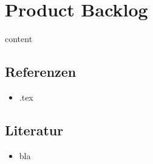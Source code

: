\documentclass{sajzk}
\begin{document}
\section{Product Backlog} 
\label{filename}

{{content}}

\subsection{Referenzen}
\begin{itemize}
    \item \href{.pdf}{} .tex
\end{itemize}

\subsection{Literatur} 

\begin{itemize}
  \item bla
\end{itemize}
\end{document}
